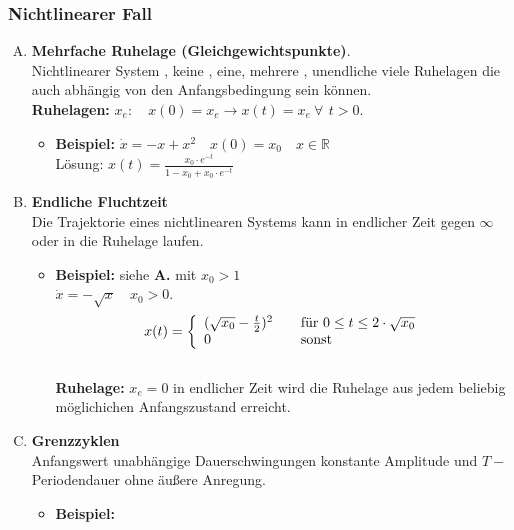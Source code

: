 \documentclass[ngerman]{tudscrreprt}
\begin{document}
\subsubsection{Nichtlinearer Fall}
\begin{enumerate}[(A)]
\item \textbf{Mehrfache Ruhelage (Gleichgewichtspunkte)}. \\
Nichtlinearer System , keine , eine, mehrere , unendliche viele Ruhelagen die auch abhängig von den Anfangsbedingung sein können.
\\ \textbf{Ruhelagen:} $x_{e}: \quad x(0) = x_{e} \rightarrow x(t) = x_{e} ~\forall \,~ t>0.$  
\begin{itemize}
\item\textbf{Beispiel:} $\dot{x} = -x + x^2 \quad x(0)= x_{0} \quad x \in \mathbb{R}$
\\
Lösung: $x(t)= \frac{x_{0} \cdot e^{-t}}{1- x_{0} + x_{0}\cdot e^{-t} }$
\begin{figure}[H] 
  \centering 
  \def\svgwidth{200pt} 
   
\end{figure} 
\end{itemize}
\item \textbf{Endliche Fluchtzeit}
\\
Die Trajektorie eines nichtlinearen Systems kann in endlicher Zeit gegen $\infty$ oder in die Ruhelage laufen.
\begin{itemize}
\item\textbf{Beispiel:} siehe \textbf{A.} mit $x_{0}>1$\\
$\dot{x} = - \sqrt{x} \quad x_{0} > 0. \quad $ \\
\[ x(t) = \left\{ 
  \begin{array}{l l}
    (\sqrt{x_{0}} - \frac{t}{2})^2 & \quad \text{für $0\leq t \leq 2\cdot \sqrt{x_{0}}$}\\
    0 & \quad \text{sonst}
  \end{array} \right.\] 
\\
\textbf{Ruhelage:} $x_{e}= 0 $ in endlicher Zeit wird die Ruhelage aus jedem beliebig möglichichen Anfangszustand erreicht.
\end{itemize}
\item\textbf{Grenzzyklen}\\
Anfangswert unabhängige Dauerschwingungen konstante Amplitude und $T-$Periodendauer ohne äußere Anregung.
\begin{itemize}
\item \textbf{Beispiel:}\\

\end{itemize}
\end{enumerate}
\end{document}
